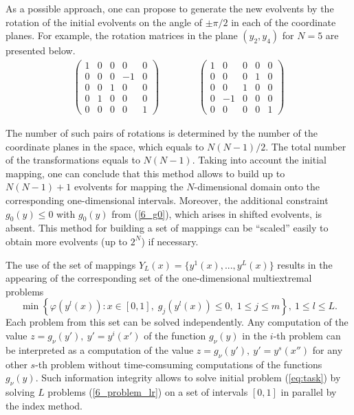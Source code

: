 \documentclass[runningheads]{llncs}
\begin{document}
As a possible approach, one can propose to generate the new evolvents by the rotation of the initial evolvents on the angle of $\pm\pi/2$ in each of the coordinate planes. For example, the rotation matrices in the plane $(y_2,y_4)$ for  $N=5$ are presented below.
\begin{eqnarray*}
 \begin{pmatrix}
  1 & 0 & 0 & 0 & 0 \\
  0 & 0 & 0 & -1 & 0 \\
  0 & 0 & 1 & 0 & 0 \\
  0 & 1 & 0 & 0 & 0 \\
  0 & 0 & 0 & 0 & 1
 \end{pmatrix}
\qquad \qquad
 \begin{pmatrix}
  1 & 0 & 0 & 0 & 0 \\
  0 & 0 & 0 & 1 & 0 \\
  0 & 0 & 1 & 0 & 0 \\
  0 & -1 & 0 & 0 & 0 \\
  0 & 0 & 0 & 0 & 1
 \end{pmatrix}
\end{eqnarray*}

The number of such pairs of rotations is determined by the number of the coordinate planes in the space, which equals to  $N(N-1)/2$. The total number of the transformations equals to $N(N-1)$. Taking into account the initial mapping, one can conclude that this method allows to build up to $N(N-1)+1$ evolvents for mapping the $N$-dimensional domain onto the corresponding one-dimensional intervals. Moreover, the additional constraint  $g_0(y) \leq 0$ with $g_0(y)$ from (\ref{6_g0}), which arises in shifted evolvents, is absent. This method for building a set of mappings can be ``scaled'' easily to obtain more evolvents (up to $2^N$) if necessary.

The use of the set of mappings $Y_L(x)=\{y^1(x),...,y^L(x)\}$ results in the appearing of the corresponding set of the one-dimensional multiextremal problems
\begin{equation}\label{6_problem_lr}
  \min{\left\{\varphi(y^l(x)):x\in [0,1], \; g_j(y^l(x))\leq 0, \; 1 \leq j \leq m\right\}}, \ 1 \leq l \leq L.
\end{equation}
Each problem from this set can be solved independently. Any computation of the value $z=g_\nu(y'),\ y'=y^i(x')$ of the function $g_\nu(y)$ in the $i$-th problem can be interpreted as a computation of the value $z=g_\nu(y'),\ y'=y^s(x'')$ for any other $s$-th problem without time-comsuming computations of the functions $g_\nu(y)$. Such information integrity allows to solve  initial problem (\ref{eq:task}) by solving $L$ problems (\ref{6_problem_lr}) on a set of intervals $[0,1]$ in parallel by the index method.
\end{document}
